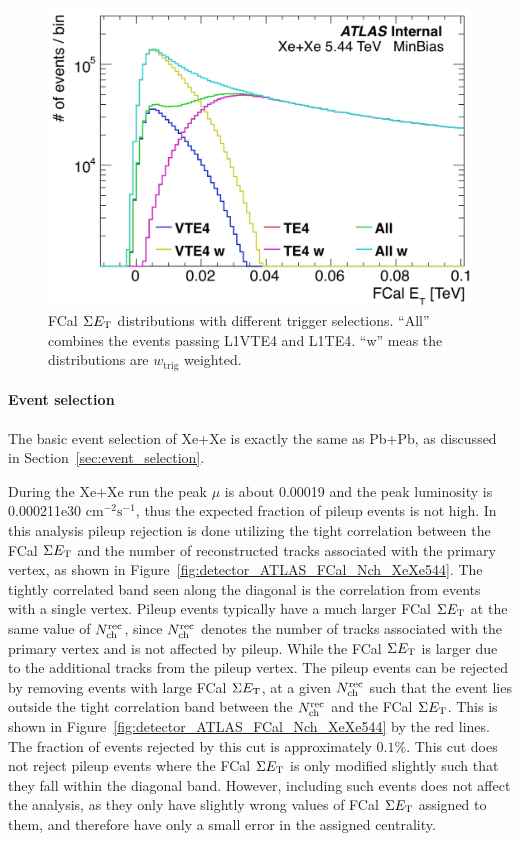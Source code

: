 \begin{figure}[H]
\centering
\includegraphics[width=.6\linewidth]{figs/chapter_detector/ATLAS_trigger_XeXe544.png}
\caption{FCal $\Sigma E_\text{T}$ distributions with different trigger selections. ``All'' combines the events passing L1VTE4 and L1TE4. ``w'' meas the distributions are $w_\text{trig}$ weighted.}
\label{fig:detector_ATLAS_trigger_XeXe544}
\end{figure}



\paragraph{Event selection}

The basic event selection of Xe+Xe is exactly the same as Pb+Pb, as discussed in Section~\ref{sec:event_selection}.

During the Xe+Xe run the peak $\mu$ is about 0.00019 and the peak luminosity is 0.000211e30 $\text{cm}^{-2}\text{s}^{-1}$, thus the expected fraction of pileup events is not high. In this analysis pileup rejection is done utilizing the tight correlation between the FCal $\Sigma E_\text{T}$ and the number of reconstructed tracks associated with the primary vertex, as shown in Figure~\ref{fig:detector_ATLAS_FCal_Nch_XeXe544}. The tightly correlated band seen along the diagonal is the correlation from events with a single vertex. Pileup events typically have a much larger FCal $\Sigma E_\text{T}$ at the same value of $N_\text{ch}^\text{rec}$, since $N_\text{ch}^\text{rec}$ denotes the number of tracks associated with the primary vertex and is not affected by pileup. While the FCal $\Sigma E_\text{T}$ is larger due to the additional tracks from the pileup vertex. The pileup events can be rejected by removing events with large FCal $\Sigma E_\text{T}$, at a given $N_\text{ch}^\text{rec}$ such that the event lies outside the tight correlation band between the $N_\text{ch}^\text{rec}$ and the FCal $\Sigma E_\text{T}$. This is shown in Figure~\ref{fig:detector_ATLAS_FCal_Nch_XeXe544} by the red lines. The fraction of events rejected by this cut is approximately $0.1\%$. This cut does not reject pileup events where the FCal $\Sigma E_\text{T}$ is only modified slightly such that they fall within the diagonal band. However, including such events does not affect the analysis, as they only have slightly wrong values of FCal $\Sigma E_\text{T}$ assigned to them, and therefore have only a small error in the assigned centrality.

